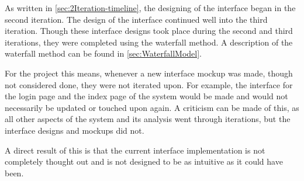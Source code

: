As written in \cref{sec:2Iteration-timeline}, the designing of the interface began in the second iteration.
The design of the interface continued well into the third iteration.
Though these interface designs took place during the second and third iterations, they were completed using the waterfall method.
A description of the waterfall method can be found in \cref{sec:WaterfallModel}.

For the project this means, whenever a new interface mockup was made, though not considered done, they were not iterated upon.
For example, the interface for the login page and the index page of the system would be made and would not necessarily be updated or touched upon again.
A criticism can be made of this, as all other aspects of the system and its analysis went through iterations, but the interface designs and mockups did not.

A direct result of this is that the current interface implementation is not completely thought out and is not designed to be as intuitive as it could have been.
